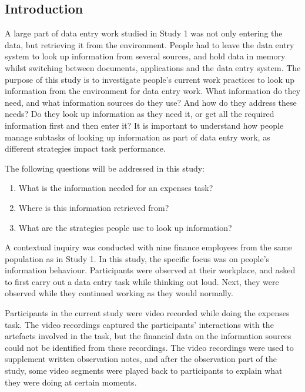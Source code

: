 \subsection{Introduction}
A large part of data entry work studied in Study 1 was not only entering the data, but retrieving it from the environment. People had to leave the data entry system to look up information from several sources, and hold data in memory whilst switching between documents, applications and the data entry system. 
The purpose of this study is to investigate people's current work practices to look up information from the environment for data entry work. What information do they need, and what information sources do they use? And how do they address these needs? Do they look up information as they need it, or get all the required information first and then enter it? It is important to understand how people manage subtasks of looking up information as part of data entry work, as different strategies impact task performance. 

The following questions will be addressed in this study:

\begin{enumerate}
\item 
What is the information needed for an expenses task?
\item 
Where is this information retrieved from?
\item 
What are the strategies people use to look up information?
\end{enumerate}

A contextual inquiry was conducted with nine finance employees from the same population as in Study 1. In this study, the specific focus was on people's information behaviour. Participants were observed at their workplace, and asked to first carry out a data entry task while thinking out loud. Next, they were observed while they continued working as they would normally.

Participants in the current study were video recorded while doing the expenses task. The video recordings captured the participants' interactions with the artefacts involved in the task, but the financial data on the information sources could not be identified from these recordings. The video recordings were used to supplement written observation notes, and after the observation part of the study, some video segments were played back to participants to explain what they were doing at certain moments.

